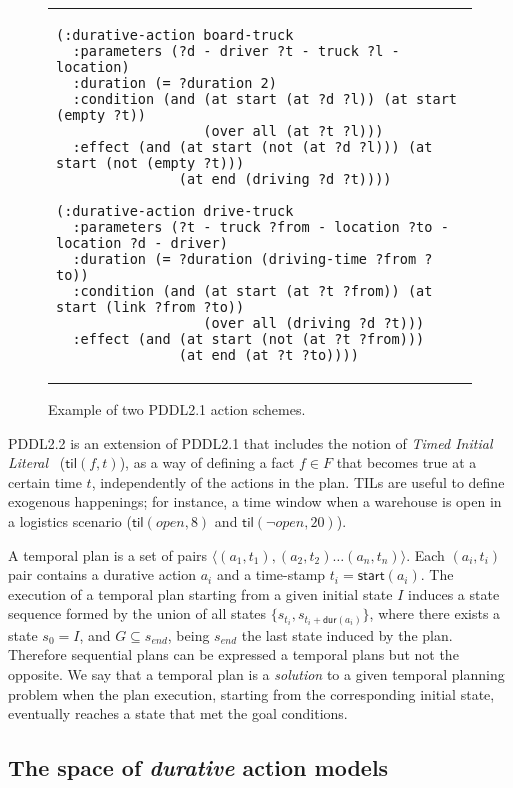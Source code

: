 \documentclass{ecai}
\newcommand{\tup}[1]{{\langle #1 \rangle}}
\newcommand{\dur}{\mathsf{dur}}    %
\newcommand{\start}{\mathsf{start}}%
\newcommand{\til}{\mathsf{til}}    %
\begin{document}
\begin{figure}
  \begin{tabular}{p{\textwidth}}
\begin{tiny}    
\begin{verbatim}
(:durative-action board-truck
  :parameters (?d - driver ?t - truck ?l - location)
  :duration (= ?duration 2)
  :condition (and (at start (at ?d ?l)) (at start (empty ?t))
                  (over all (at ?t ?l)))
  :effect (and (at start (not (at ?d ?l))) (at start (not (empty ?t)))
               (at end (driving ?d ?t))))

(:durative-action drive-truck
  :parameters (?t - truck ?from - location ?to - location ?d - driver)
  :duration (= ?duration (driving-time ?from ?to))
  :condition (and (at start (at ?t ?from)) (at start (link ?from ?to))
                  (over all (driving ?d ?t)))
  :effect (and (at start (not (at ?t ?from))) 
               (at end (at ?t ?to))))
\end{verbatim}
\end{tiny}    
\end{tabular}
\caption{\small Example of two PDDL2.1 action schemes.}
\label{fig:exampleactions2}
\end{figure}

PDDL2.2 is an extension of PDDL2.1 that includes the notion of {\em Timed Initial Literal}~\cite{hoffmann2005} ($\til(f,t)$), as a way of defining a fact $f\in F$ that becomes true at a certain time $t$, independently of the actions in the plan. TILs are useful to define exogenous happenings; for instance, a time window when a warehouse is open in a logistics scenario ($\til(open,8)$ and $\til(\neg open,20)$).

A temporal plan is a set of pairs $\tup{(a_1,t_1),(a_2,t_2)\ldots (a_n,t_n)}$. Each $(a_i,t_i)$ pair contains a durative action $a_i$ and a time-stamp $t_i=\start(a_i)$. The execution of a temporal plan starting from a given initial state $I$ induces a state sequence formed by the union of all states $\{s_{t_i}, s_{t_i+\dur(a_i)}\}$, where there exists a state $s_{0}=I$, and $G\subseteq s_{end}$, being $s_{end}$ the last state induced by the plan. Therefore sequential plans can be expressed a temporal plans but not the opposite. We say that a temporal plan is a {\em solution} to a given temporal planning problem when the plan execution, starting from the corresponding initial state, eventually reaches a state that met the goal conditions.


\subsection{The space of {\em durative} action models}
\label{sec:action-space}
\end{document}
